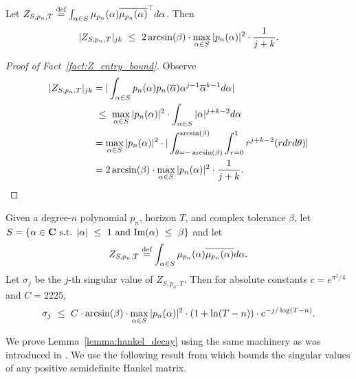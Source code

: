 \begin{fact}
    \label{fact:Z_entry_bound}
    Let $Z_{S, p_n, T} \stackrel{\text{def}}{=} \int_{\alpha \in S} \mu_{p_n}(\alpha) \overline{\mu_{p_n}(\alpha)}^{\top} d \alpha$. Then
    \begin{equation*}
        |  Z_{S, p_n, T} |_{jk} ~\le~ 2 \arcsin(\beta) \cdot \max_{\alpha \in S} |p_n(\alpha)|^2  \cdot  \frac{1}{j + k}.
    \end{equation*}
\end{fact}
\begin{proof}[Proof of Fact~\ref{fact:Z_entry_bound}]
    Observe
\begin{align*}
        | Z_{S, p_n, T} |_{jk} &  = | \int_{\alpha \in S} p_n(\alpha) p_n(\overline{\alpha}) \alpha^{j-1} \overline{\alpha}^{k-1} d \alpha | \\
        & ~\le~ \max_{\alpha \in S} |p_n(\alpha)|^2 \cdot  \int_{\alpha \in S}  |\alpha|^{j + k -2} d \alpha  \\
        & = \max_{\alpha \in S} |p_n(\alpha)|^2 \cdot | \int_{\theta = - \arcsin(\beta)}^{\arcsin(\beta)} \int_{r=0}^1 r^{j +  k - 2}  (r dr d \theta) | \\
         & = 2 \arcsin(\beta) \cdot \max_{\alpha \in S} |p_n(\alpha)|^2  \cdot  \frac{1}{j + k}.
        \end{align*}
\end{proof}
\begin{lemma}
\label{lemma:hankel_decay}
Given a degree-$n$ polynomial $p_n$, horizon $T$, and complex tolerance $\beta$, let $S= \left \{ \alpha \in \mathbf{C} \textrm{ s.t. } |\alpha| ~\le~ 1 \textrm{ and } \mathrm{Im}(\alpha) ~\le~ \beta \right \}$ and let
\begin{equation*}
    Z_{S, p_n, T} \stackrel{\text{def}}{=} \int_{\alpha \in S} \mu_{p_n}(\alpha) \overline{\mu_{p_n}(\alpha)} d \alpha.
\end{equation*}
    Let $\sigma_j$ be the $j$-th singular value of $Z_{S, p_n, T}$. Then for absolute constants $c = e^{\pi^2/4}$ and $C = 2225$,
    \begin{equation}
        \sigma_j ~\le~  C \cdot   \arcsin(\beta)  \cdot \max_{\alpha \in S} |p_n(\alpha)|^2 \cdot (1 +  \ln(T-n)) \cdot c^{-j/\log(T-n)}.
    \end{equation}
\end{lemma}
We prove Lemma~\ref{lemma:hankel_decay} using the same machinery as was introduced in \cite{hazan2017learning}. We use the following result from \cite{beckermann2017singular} which bounds the singular values of any positive semidefinite Hankel matrix. 
